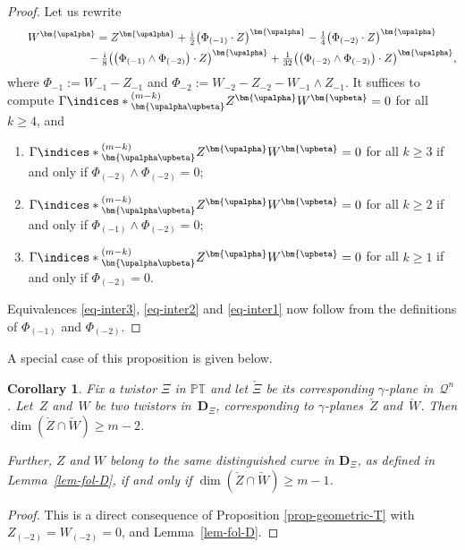 \documentclass[pdftex]{sigma}
\numberwithin{equation}{section}
\newtheorem{Corollary}[Theorem]{Corollary}
\newcommand{\mbf} [1]{\mathbf{#1}}
\newcommand{\mc} [1]{\mathcal{#1}}
\newcommand{\ii} {\mathrm{i}}
\newcommand{\ind} {\indices}
\newcommand{\PT} {\mathbb{PT}}
\begin{document}
\begin{proof}Let us rewrite
\begin{gather*}
W^{\bm{\upalpha}} = Z^{\bm{\upalpha}} + \tfrac{\ii}{2} \big( \Phi_{(-1)} \cdot Z \big)^{\bm{\upalpha}} - \tfrac{1}{4} \big( \Phi_{(-2)} \cdot Z \big)^{\bm{\upalpha}} \\
\hphantom{W^{\bm{\upalpha}} =}{} - \tfrac{\ii}{8} \big( \big( \Phi_{(-1)} \wedge \Phi_{(-2)} \big) \cdot Z \big)^{\bm{\upalpha}} + \tfrac{1}{32} \big( \big( \Phi_{(-2)} \wedge \Phi_{(-2)} \big) \cdot Z \big)^{\bm{\upalpha}} ,
\end{gather*}
where $\Phi_{-1} := W_{-1} - Z_{-1}$ and $\Phi_{-2} := W_{-2} - Z_{-2} - W_{-1} \wedge Z_{-1}$. It suf\/f\/ices to compute $\Gamma \ind*{^{(m-k)}_{\bm{\upalpha \upbeta}}} Z^{\bm{\upalpha}} W^{\bm{\upbeta}} = 0$ for all $k \geq 4$, and
\begin{enumerate}\itemsep=0pt
\item[1)] $\Gamma \ind*{^{(m-k)}_{\bm{\upalpha \upbeta}}} Z^{\bm{\upalpha}} W^{\bm{\upbeta}} = 0$ for all $k \geq 3$ if and only if $\Phi_{(-2)} \wedge \Phi_{(-2)} = 0$;
\item[2)] $\Gamma \ind*{^{(m-k)}_{\bm{\upalpha \upbeta}}} Z^{\bm{\upalpha}} W^{\bm{\upbeta}} = 0$ for all $k \geq 2$ if and only if $\Phi_{(-1)} \wedge \Phi_{(-2)} = 0$;
\item[3)] $\Gamma \ind*{^{(m-k)}_{\bm{\upalpha \upbeta}}} Z^{\bm{\upalpha}} W^{\bm{\upbeta}} = 0$ for all $k \geq 1$ if and only if $\Phi_{(-2)}= 0$.
\end{enumerate}
Equivalences \eqref{eq-inter3}, \eqref{eq-inter2} and \eqref{eq-inter1} now follow from the def\/initions of $\Phi_{(-1)}$ and $\Phi_{(-2)}$.
\end{proof}

A special case of this proposition is given below.
\begin{Corollary}\label{cor-D-geom}
Fix a twistor $\Xi$ in $\PT$ and let $\check{\Xi }$ be its corresponding $\gamma$-plane in~$\mc{Q}^n$. Let~$Z$ and~$W$ be two twistors in~$\mbf{D}_\Xi$, corresponding to $\gamma$-planes~$\check{Z}$ and~$\check{W}$. Then $\dim ( \check{Z} \cap \check{W} ) \geq m-2$.

Further, $Z$ and $W$ belong to the same distinguished curve in $\mbf{D}_\Xi$, as defined in Lemma~{\rm \ref{lem-fol-D}}, if and only if $\dim(\check{Z} \cap \check{W}) \geq m-1$.
\end{Corollary}

\begin{proof}
This is a direct consequence of Proposition \ref{prop-geometric-T} with $Z_{(-2)} = W_{(-2)} = 0$, and Lem\-ma~\ref{lem-fol-D}.
\end{proof}
\end{document}
